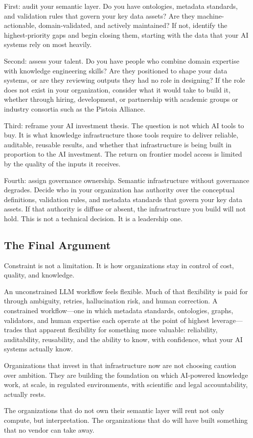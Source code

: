 \documentclass[man,12pt,donotrepeattitle]{apa7}
\begin{document}
First: audit your semantic layer. Do you have ontologies, metadata standards,
and validation rules that govern your key data assets? Are they
machine-actionable, domain-validated, and actively maintained? If not,
identify the highest-priority gaps and begin closing them, starting with the
data that your AI systems rely on most heavily.

Second: assess your talent. Do you have people who combine domain expertise
with knowledge engineering skills? Are they positioned to shape your data
systems, or are they reviewing outputs they had no role in designing? If the
role does not exist in your organization, consider what it would take to
build it, whether through hiring, development, or partnership with academic
groups or industry consortia such as the Pistoia Alliance.

Third: reframe your AI investment thesis. The question is not which AI tools
to buy. It is what knowledge infrastructure those tools require to deliver
reliable, auditable, reusable results, and whether that infrastructure is
being built in proportion to the AI investment. The return on frontier model
access is limited by the quality of the inputs it receives.

Fourth: assign governance ownership. Semantic infrastructure without
governance degrades. Decide who in your organization has authority over the
conceptual definitions, validation rules, and metadata standards that govern
your key data assets. If that authority is diffuse or absent, the
infrastructure you build will not hold. This is not a technical decision. It
is a leadership one.

\subsection{The Final Argument}

Constraint is not a limitation. It is how organizations stay in control of
cost, quality, and knowledge.

An unconstrained LLM workflow feels flexible. Much of that flexibility is
paid for through ambiguity, retries, hallucination risk, and human
correction. A constrained workflow---one in which metadata standards,
ontologies, graphs, validators, and human expertise each operate at the
point of highest leverage---trades that apparent flexibility for something
more valuable: reliability, auditability, reusability, and the ability to
know, with confidence, what your AI systems actually know.

Organizations that invest in that infrastructure now are not choosing caution
over ambition. They are building the foundation on which AI-powered knowledge
work, at scale, in regulated environments, with scientific and legal
accountability, actually rests.

The organizations that do not own their semantic layer will rent not only
compute, but interpretation. The organizations that do will have built
something that no vendor can take away.


\printbibliography
\end{document}
